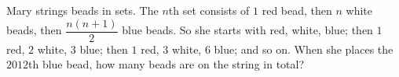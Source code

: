 Mary strings beads in sets. The $n$th set consists of $1$ red bead, then $n$ white beads, then $\dfrac{n(n+1)}{2}$ blue beads. So she starts with red, white, blue; then $1$ red, $2$ white, $3$ blue; then $1$ red, $3$ white, $6$ blue; and so on. When she places the $2012$th blue bead, how many beads are on the string in total?

